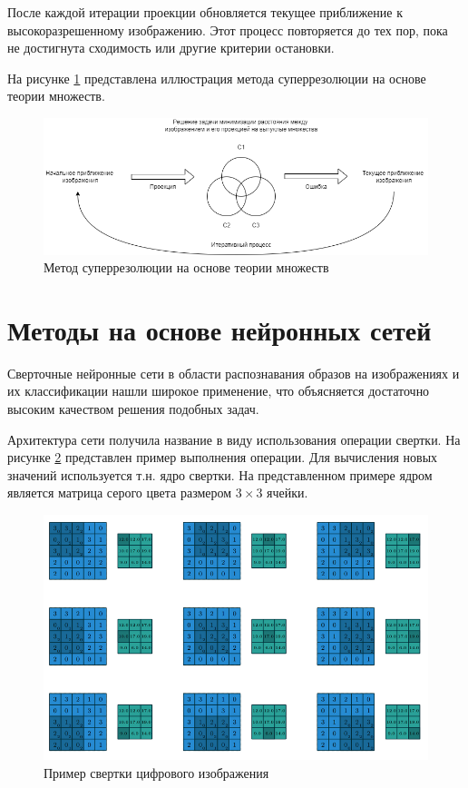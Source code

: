 После каждой итерации проекции обновляется текущее приближение к высокоразрешенному изображению. Этот процесс повторяется до тех пор, пока не достигнута сходимость или другие критерии остановки.    

На рисунке \ref{fig:convex} представлена иллюстрация метода суперрезолюции на основе теории множеств.

\begin{figure}[H]
	\centering
	\includegraphics[scale=0.6]{assets/convex.png}
	\caption{Метод суперрезолюции на основе теории множеств}
	\label{fig:convex}
\end{figure}

\section{Методы на основе нейронных сетей}

Сверточные нейронные сети в области распознавания образов на изображениях и их классификации нашли широкое применение, что объясняется достаточно высоким качеством решения подобных задач.

Архитектура сети получила название в виду использования операции свертки. На рисунке \ref{conv} представлен пример выполнения операции. Для вычисления новых значений используется т.н. ядро свертки. На представленном примере ядром является матрица серого цвета размером $3\times3$ ячейки.

\begin{figure}[H]
	\centering
	\includegraphics[scale=1.25]{assets/convolution_example}
	\caption{Пример свертки цифрового изображения}
	\label{conv}
\end{figure}

